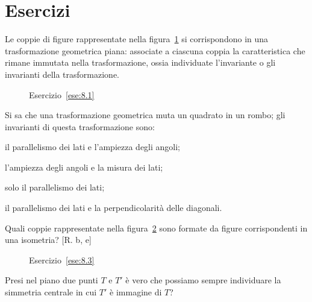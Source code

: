 \section{Esercizi}


\begin{esercizio}
\label{ese:8.1}
Le coppie di figure rappresentate nella figura~\ref{fig:ese8.1} si corrispondono in una trasformazione geometrica piana: associate a ciascuna coppia la caratteristica che rimane immutata nella trasformazione, ossia individuate l'invariante o gli invarianti della trasformazione.
\end{esercizio}

\begin{figure}[!htb]
	\centering
	\caption{Esercizio~\ref{ese:8.1}}\label{fig:ese8.1}
\end{figure}

\begin{esercizio}
\label{ese:8.2}
Si sa che una trasformazione geometrica muta un quadrato in un rombo; gli invarianti di questa trasformazione sono:
\begin{enumeratea}
\item il parallelismo dei lati e l'ampiezza degli angoli;
\item l'ampiezza degli angoli e la misura dei lati;
\item solo il parallelismo 	dei lati;
\item il parallelismo dei lati e la perpendicolarità delle diagonali.
\end{enumeratea}
\end{esercizio}

\begin{esercizio}
\label{ese:8.3}
Quali coppie rappresentate nella figura~\ref{fig:ese8.3} sono formate da figure corrispondenti in una isometria?
[R. b, e]
\end{esercizio}

\begin{figure}[!htb]
	\centering
	\caption{Esercizio~\ref{ese:8.3}}\label{fig:ese8.3}
\end{figure}

\begin{esercizio}
\label{ese:8.4}
Presi nel piano due punti $T$ e $T'$ è vero che possiamo sempre individuare la simmetria centrale in cui $T'$ è immagine di $T$?
\end{esercizio}

